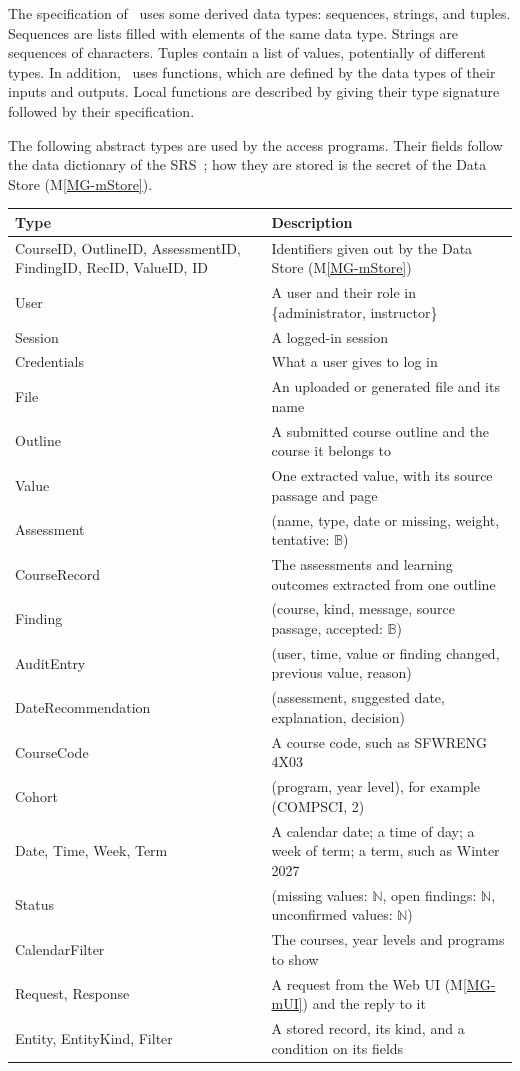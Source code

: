 \documentclass[12pt, titlepage]{article}
\newcommand{\mref}[1]{M\ref{MG-#1}}
\begin{document}
\noindent
The specification of \progname \ uses some derived data types: sequences, strings, and
tuples. Sequences are lists filled with elements of the same data type. Strings
are sequences of characters. Tuples contain a list of values, potentially of
different types. In addition, \progname \ uses functions, which
are defined by the data types of their inputs and outputs. Local functions are
described by giving their type signature followed by their specification.

The following abstract types are used by the access programs. Their fields
follow the data dictionary of the SRS~\citep{TeamBVSH2026SRS}; how they are
stored is the secret of the Data Store (\mref{mStore}).

\begin{center}
\renewcommand{\arraystretch}{1.2}
\begin{longtable}{>{\raggedright\arraybackslash}p{4.6cm} >{\raggedright\arraybackslash}p{10.1cm}}
\toprule
\textbf{Type} & \textbf{Description}\\
\midrule
CourseID, OutlineID, AssessmentID, FindingID, RecID, ValueID, ID & Identifiers given out by the Data Store (\mref{mStore})\\
User & A user and their role in \{administrator, instructor\}\\
Session & A logged-in session\\
Credentials & What a user gives to log in\\
File & An uploaded or generated file and its name\\
Outline & A submitted course outline and the course it belongs to\\
Value & One extracted value, with its source passage and page\\
Assessment & (name, type, date or missing, weight, tentative: $\mathbb{B}$)\\
CourseRecord & The assessments and learning outcomes extracted from one outline\\
Finding & (course, kind, message, source passage, accepted: $\mathbb{B}$)\\
AuditEntry & (user, time, value or finding changed, previous value, reason)\\
DateRecommendation & (assessment, suggested date, explanation, decision)\\
CourseCode & A course code, such as SFWRENG 4X03\\
Cohort & (program, year level), for example (COMPSCI, 2)\\
Date, Time, Week, Term & A calendar date; a time of day; a week of term; a term, such as Winter 2027\\
Status & (missing values: $\mathbb{N}$, open findings: $\mathbb{N}$, unconfirmed values: $\mathbb{N}$)\\
CalendarFilter & The courses, year levels and programs to show\\
Request, Response & A request from the Web UI (\mref{mUI}) and the reply to it\\
Entity, EntityKind, Filter & A stored record, its kind, and a condition on its fields\\
\bottomrule
\end{longtable}
\end{center}
\end{document}
